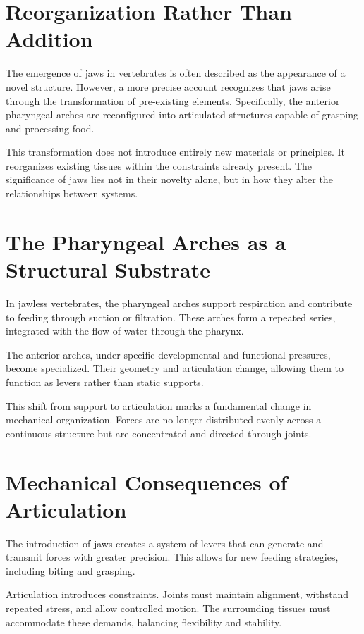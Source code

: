 \documentclass[11pt,oneside]{book}
\begin{document}
\section{Reorganization Rather Than Addition}

The emergence of jaws in vertebrates is often described as the appearance of a novel structure. However, a more precise account recognizes that jaws arise through the transformation of pre-existing elements. Specifically, the anterior pharyngeal arches are reconfigured into articulated structures capable of grasping and processing food.

This transformation does not introduce entirely new materials or principles. It reorganizes existing tissues within the constraints already present. The significance of jaws lies not in their novelty alone, but in how they alter the relationships between systems.

\section{The Pharyngeal Arches as a Structural Substrate}

In jawless vertebrates, the pharyngeal arches support respiration and contribute to feeding through suction or filtration. These arches form a repeated series, integrated with the flow of water through the pharynx.

The anterior arches, under specific developmental and functional pressures, become specialized. Their geometry and articulation change, allowing them to function as levers rather than static supports.

This shift from support to articulation marks a fundamental change in mechanical organization. Forces are no longer distributed evenly across a continuous structure but are concentrated and directed through joints.

\section{Mechanical Consequences of Articulation}

The introduction of jaws creates a system of levers that can generate and transmit forces with greater precision. This allows for new feeding strategies, including biting and grasping.

Articulation introduces constraints. Joints must maintain alignment, withstand repeated stress, and allow controlled motion. The surrounding tissues must accommodate these demands, balancing flexibility and stability.
\end{document}
